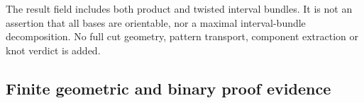 The result field  includes both product and
twisted interval bundles. It is not an assertion that all bases are
orientable, nor a maximal interval-bundle decomposition. No full cut
geometry, pattern transport, component extraction or knot verdict is added.

\subsection{Finite geometric and binary proof evidence}

